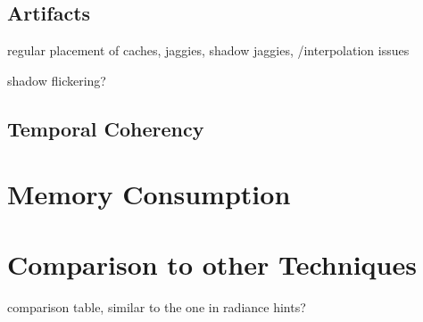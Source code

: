 \documentclass[thesis.tex]{subfiles}
\begin{document}


\subsection{Artifacts}
regular placement of caches, jaggies,
shadow jaggies,
/interpolation issues

shadow flickering?

\subsection{Temporal Coherency}


\section{Memory Consumption}

\section{Comparison to other Techniques} \label{sec:eva:comparisiontoother}

comparison table, similar to the one in radiance hints?

\subfilebib %
\end{document}
